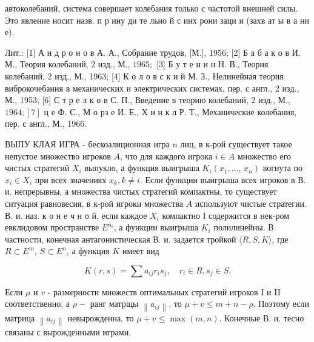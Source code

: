 \documentclass[10pt]{article}
\begin{document}
автоколебаний, система совершает колебания только с частотой внешней силы. Это явление носит назв. п р ину ди те льно й с инх рони заци и (захв ат ы в а ни е).



Лит.: [1] А н д р о н о в А. А., Собрание трудов, [М.], 1956; [2] Б а б а к о в И. М., Теория колебаний, 2 изд., М., $1965 ;$ [3] Б у т е н и н Н. В., Теория колебаний, 2 изд., М., 1963; [4] К о л о в с к и й М. З., Нелинейная теория виброкочебания в механических и электрических системах, пер. с англ., 2 изд., М., 1953; [6] С т р е л к о в С. П., Введение в теорию колебаний, 2 изд., М., $1964 ;[7]$ ц е Ф. С., М о рз е И. Е., Х и н к л Р. Т., Механические колебания, пер. с англ., М., 1966.



ВЫПУ КЛАЯ ИГРА - бескоалиционная игра $n$ лиц, в к-рой существует такое непустое множество игроков $A$, что для каждого игрока $i \in A$ множество его чистых стратегий $X_{i}$ выпукло, а функция выигрыша $K_{i}\left(x_{1}, \ldots\right.$, $\left.x_{n}\right)$ вогнута по $x_{i} \in X_{i}$ при всех значениях $x_{k}, k \neq i$. Если функции выигрыша всех игроков в В. и. непрерывны, а множества чистых стратегий компактны, то существует ситуация равновесия, в к-рой игроки множества $A$ используют чистые стратегии. В. и. наз. к о н е ч н о й, если каждое $X_{i}$ компактно І содержится в нек-ром евклидовом пространстве $E^{n_{i}}$, а функции выигрыша $K_{i}$ полилинейны. В частности, конечная антагонистическая В. и. задается тройкой $\langle R, S, K\rangle$, где $R \subset E^{m}$, $S \subset E^{n}$, а функция $K$ имеет вид



\[

K(r, s)=\sum a_{i j} r_{i} s_{j}, \quad r_{i} \in R, s_{j} \in S .

\]



Если $\mu$ и $v$ - размерности множеств оптимальных стратегий игроков I и II соответственно, а $\rho-$ ранг матріцы $\left\|a_{i j}\right\|$, то $\mu+v \leqslant m+n-\rho$. Поэтому если матрица $\left\|a_{i j}\right\|$ невырожденна, то $\mu+v \leqslant \max (m, n)$. Конечные В. и. тесно связаны с вырожденными играми.
\end{document}
